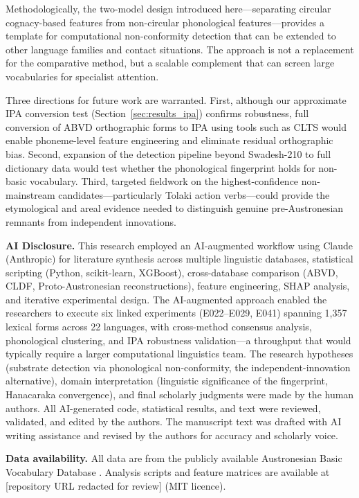 \documentclass[12pt]{article}
\begin{document}
Methodologically, the two-model design introduced here---separating circular cognacy-based features from non-circular phonological features---provides a template for computational non-conformity detection that can be extended to other language families and contact situations.
The approach is not a replacement for the comparative method, but a scalable complement that can screen large vocabularies for specialist attention.

Three directions for future work are warranted.
First, although our approximate IPA conversion test (Section~\ref{sec:results_ipa}) confirms robustness, full conversion of ABVD orthographic forms to IPA using tools such as CLTS \citep{anderson2018} would enable phoneme-level feature engineering and eliminate residual orthographic bias.
Second, expansion of the detection pipeline beyond Swadesh-210 to full dictionary data would test whether the phonological fingerprint holds for non-basic vocabulary.
Third, targeted fieldwork on the highest-confidence non-mainstream candidates---particularly Tolaki action verbs---could provide the etymological and areal evidence needed to distinguish genuine pre-Austronesian remnants from independent innovations.

\vspace{1em}
\noindent\textbf{AI Disclosure.}
This research employed an AI-augmented workflow using Claude (Anthropic) for literature synthesis across multiple linguistic databases, statistical scripting (Python, scikit-learn, XGBoost), cross-database comparison (ABVD, CLDF, Proto-Austronesian reconstructions), feature engineering, SHAP analysis, and iterative experimental design.
The AI-augmented approach enabled the researchers to execute six linked experiments (E022--E029, E041) spanning 1,357 lexical forms across 22 languages, with cross-method consensus analysis, phonological clustering, and IPA robustness validation---a throughput that would typically require a larger computational linguistics team.
The research hypotheses (substrate detection via phonological non-conformity, the independent-innovation alternative), domain interpretation (linguistic significance of the fingerprint, Hanacaraka convergence), and final scholarly judgments were made by the human authors.
All AI-generated code, statistical results, and text were reviewed, validated, and edited by the authors.
The manuscript text was drafted with AI writing assistance and revised by the authors for accuracy and scholarly voice.

\vspace{1em}
\noindent\textbf{Data availability.} All data are from the publicly available Austronesian Basic Vocabulary Database \citep{greenhill2008}. Analysis scripts and feature matrices are available at [repository URL redacted for review] (MIT licence).


\end{document}
